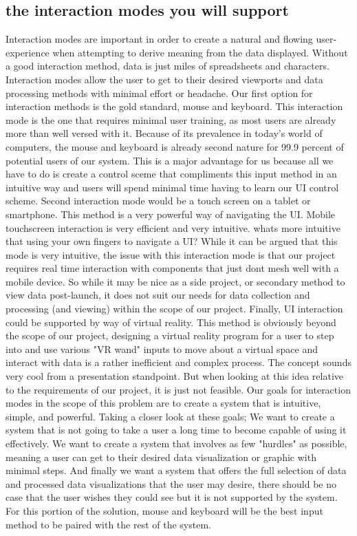 \documentclass[10pt,draftclsnofoot,onecolumn]{IEEEtran}
\begin{document}
\subsection{the interaction modes you will support}
Interaction modes are important in order to create a natural and flowing user-experience when attempting to derive meaning from the data displayed. Without a good interaction method, data is just miles of spreadsheets and characters. Interaction modes allow the user to get to their desired viewports and data processing methods with minimal effort or headache.
Our first option for interaction methods is the gold standard, mouse and keyboard. This interaction mode is the one that requires minimal user training, as most users are already more than well versed with it. Because of its prevalence in today's world of computers, the mouse and keyboard is already second nature for 99.9 percent of potential users of our system. This is a major advantage for us because all we have to do is create a control sceme that compliments this input method in an intuitive way and users will spend minimal time having to learn our UI control scheme.
Second interaction mode would be a touch screen on a tablet or smartphone. This method is a very powerful way of navigating the UI. Mobile touchscreen interaction is very efficient and very intuitive. whats more intuitive that using your own fingers to navigate a UI? While it can be argued that this mode is very intuitive, the issue with this interaction mode is that our project requires real time interaction with components that just dont mesh well with a mobile device. So while it may be nice as a side project, or secondary method to view data post-launch, it does not suit our needs for data collection and processing (and viewing) within the scope of our project.
Finally, UI interaction could be supported by way of virtual reality. This method is obviously beyond the scope of our project, designing a virtual reality program for a user to step into and use various "VR wand" inputs to move about a virtual space and interact with data is a rather inefficient and complex process. The concept sounds very cool from a presentation standpoint. But when looking at this idea relative to the requirements of our project, it is just not feasible.
Our goals for interaction modes in the scope of this problem are to create a system that is intuitive, simple, and powerful. Taking a closer look at these goals; We want to create a system that is not going to take a user a long time to become capable of using it effectively. We want to create a system that involves as few "hurdles" as possible, meaning a user can get to their desired data visualization or graphic with minimal steps. And finally we want a system that offers the full selection of data and processed data visualizations that the user may desire, there should be no case that the user wishes they could see but it is not supported by the system. For this portion of the solution, mouse and keyboard will be the best input method to be paired with the rest of the system.
\end{document}
